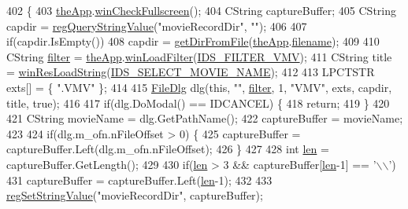 \begin{DoxyCode}
402 \{
403   \mbox{\hyperlink{_v_b_a_8cpp_a8095a9d06b37a7efe3723f3218ad8fb3}{theApp}}.\mbox{\hyperlink{class_v_b_a_a340eaeeb7fcfc242f08ac3442d991a96}{winCheckFullscreen}}();
404   CString captureBuffer;
405   CString capdir = \mbox{\hyperlink{_reg_8cpp_a618826d274df0d9c19fab2ff28bd9008}{regQueryStringValue}}(\textcolor{stringliteral}{"movieRecordDir"}, \textcolor{stringliteral}{""});
406   
407   \textcolor{keywordflow}{if}(capdir.IsEmpty())
408     capdir = \mbox{\hyperlink{class_main_wnd_a55c4858ec2c3f621790c9c7aec67011e}{getDirFromFile}}(\mbox{\hyperlink{_v_b_a_8cpp_a8095a9d06b37a7efe3723f3218ad8fb3}{theApp}}.\mbox{\hyperlink{class_v_b_a_a66eee6b61ec8bee20f21164cb0c37d2d}{filename}});
409 
410   CString \mbox{\hyperlink{_s_d_l_8cpp_af0122ee4312107103b580a98c74a4ea6}{filter}} = \mbox{\hyperlink{_v_b_a_8cpp_a8095a9d06b37a7efe3723f3218ad8fb3}{theApp}}.\mbox{\hyperlink{class_v_b_a_a228edf26b0dc4129658c174ee5a3c27c}{winLoadFilter}}(\mbox{\hyperlink{resource_8h_ac3105368cbd3360f30fb8d2c657b5c49}{IDS\_FILTER\_VMV}});
411   CString title = \mbox{\hyperlink{_win_res_util_8cpp_a416e85e80ab9b01376e87251c83d1a5a}{winResLoadString}}(\mbox{\hyperlink{resource_8h_aca81d4df4d65876990f3cda2b81d5a34}{IDS\_SELECT\_MOVIE\_NAME}});
412   
413   LPCTSTR exts[] = \{ \textcolor{stringliteral}{".VMV"} \};
414 
415   \mbox{\hyperlink{class_file_dlg}{FileDlg}} dlg(\textcolor{keyword}{this}, \textcolor{stringliteral}{""}, \mbox{\hyperlink{_s_d_l_8cpp_af0122ee4312107103b580a98c74a4ea6}{filter}}, 1, \textcolor{stringliteral}{"VMV"}, exts, capdir, title, \textcolor{keyword}{true});
416   
417   \textcolor{keywordflow}{if}(dlg.DoModal() == IDCANCEL) \{
418     \textcolor{keywordflow}{return};
419   \}
420   
421   CString movieName = dlg.GetPathName();
422   captureBuffer = movieName;
423   
424   \textcolor{keywordflow}{if}(dlg.m\_ofn.nFileOffset > 0) \{
425     captureBuffer = captureBuffer.Left(dlg.m\_ofn.nFileOffset);
426   \}
427 
428   \textcolor{keywordtype}{int} \mbox{\hyperlink{expr-lex_8cpp_afed088663f8704004425cdae2120b9b3}{len}} = captureBuffer.GetLength();
429 
430   \textcolor{keywordflow}{if}(\mbox{\hyperlink{expr-lex_8cpp_afed088663f8704004425cdae2120b9b3}{len}} > 3 && captureBuffer[\mbox{\hyperlink{expr-lex_8cpp_afed088663f8704004425cdae2120b9b3}{len}}-1] == \textcolor{charliteral}{'\(\backslash\)\(\backslash\)'})
431     captureBuffer = captureBuffer.Left(\mbox{\hyperlink{expr-lex_8cpp_afed088663f8704004425cdae2120b9b3}{len}}-1);
432 
433   \mbox{\hyperlink{_reg_8cpp_a37fa244e34332f058ba14f206dc7e0ea}{regSetStringValue}}(\textcolor{stringliteral}{"movieRecordDir"}, captureBuffer);

\end{DoxyCode}
